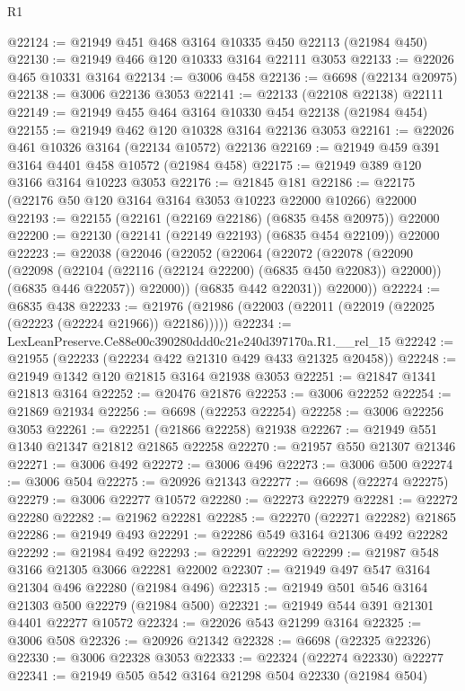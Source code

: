 \begin{lexlean}{R1}
\begin{coremodule}
@22124 := @21949 @451 @468 @3164 @10335 @450 @22113 (@21984 @450)
@22130 := @21949 @466 @120 @10333 @3164 @22111 @3053
@22133 := @22026 @465 @10331 @3164
@22134 := @3006 @458
@22136 := @6698 (@22134 @20975)
@22138 := @3006 @22136 @3053
@22141 := @22133 (@22108 @22138) @22111
@22149 := @21949 @455 @464 @3164 @10330 @454 @22138 (@21984 @454)
@22155 := @21949 @462 @120 @10328 @3164 @22136 @3053
@22161 := @22026 @461 @10326 @3164 (@22134 @10572) @22136
@22169 := @21949 @459 @391 @3164 @4401 @458 @10572 (@21984 @458)
@22175 := @21949 @389 @120 @3166 @3164 @10223 @3053
@22176 := @21845 @181
@22186 := @22175 (@22176 @50 @120 @3164 @3164 @3053 @10223 @22000 @10266) @22000
@22193 := @22155 (@22161 (@22169 @22186) (@6835 @458 @20975)) @22000
@22200 := @22130 (@22141 (@22149 @22193) (@6835 @454 @22109)) @22000
@22223 := @22038
    (@22046
      (@22052
        (@22064
          (@22072
            (@22078
              (@22090
                (@22098 (@22104 (@22116 (@22124 @22200) (@6835 @450 @22083)) @22000))
                (@6835 @446 @22057))
              @22000))
          (@6835 @442 @22031))
        @22000))
@22224 := @6835 @438
@22233 := @21976 (@21986 (@22003 (@22011 (@22019 (@22025 (@22223 (@22224 @21966)) @22186)))))
@22234 := LexLeanPreserve.Ce88e00c390280ddd0c21e240d397170a.R1.__rel_15
@22242 := @21955 (@22233 (@22234 @422 @21310 @429 @433 @21325 @20458))
@22248 := @21949 @1342 @120 @21815 @3164 @21938 @3053
@22251 := @21847 @1341 @21813 @3164
@22252 := @20476 @21876
@22253 := @3006 @22252
@22254 := @21869 @21934
@22256 := @6698 (@22253 @22254)
@22258 := @3006 @22256 @3053
@22261 := @22251 (@21866 @22258) @21938
@22267 := @21949 @551 @1340 @21347 @21812 @21865 @22258
@22270 := @21957 @550 @21307 @21346
@22271 := @3006 @492
@22272 := @3006 @496
@22273 := @3006 @500
@22274 := @3006 @504
@22275 := @20926 @21343
@22277 := @6698 (@22274 @22275)
@22279 := @3006 @22277 @10572
@22280 := @22273 @22279
@22281 := @22272 @22280
@22282 := @21962 @22281
@22285 := @22270 (@22271 @22282) @21865
@22286 := @21949 @493
@22291 := @22286 @549 @3164 @21306 @492 @22282
@22292 := @21984 @492
@22293 := @22291 @22292
@22299 := @21987 @548 @3166 @21305 @3066 @22281 @22002
@22307 := @21949 @497 @547 @3164 @21304 @496 @22280 (@21984 @496)
@22315 := @21949 @501 @546 @3164 @21303 @500 @22279 (@21984 @500)
@22321 := @21949 @544 @391 @21301 @4401 @22277 @10572
@22324 := @22026 @543 @21299 @3164
@22325 := @3006 @508
@22326 := @20926 @21342
@22328 := @6698 (@22325 @22326)
@22330 := @3006 @22328 @3053
@22333 := @22324 (@22274 @22330) @22277
@22341 := @21949 @505 @542 @3164 @21298 @504 @22330 (@21984 @504)

\end{coremodule}
\end{lexlean}
